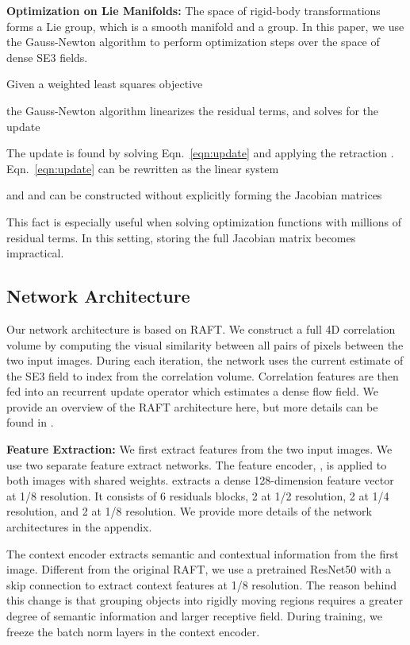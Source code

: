 \documentclass[final]{cvpr}
\begin{document}
\vspace{1mm} \noindent \textbf{Optimization on Lie Manifolds:} The space of rigid-body transformations forms a Lie group, which is a smooth manifold and a group. In this paper, we use the Gauss-Newton algorithm to perform optimization steps over the space of dense SE3 fields. 

Given a weighted least squares objective

the Gauss-Newton algorithm linearizes the residual terms, and solves for the update

The update is found by solving Eqn.~\ref{eqn:update} and applying the retraction . Eqn.~\ref{eqn:update} can be rewritten as the linear system

and  and  can be constructed without explicitly forming the Jacobian matrices

This fact is especially useful when solving optimization functions with millions of residual terms. In this setting, storing the full Jacobian matrix becomes impractical.

\subsection{Network Architecture}
Our network architecture is based on RAFT\cite{teed2020raft}. We construct a full 4D correlation volume by computing the visual similarity between all pairs of pixels between the two input images. During each iteration, the network uses the current estimate of the SE3 field to index from the correlation volume. Correlation features are then fed into an recurrent update operator which estimates a dense flow field. We provide an overview of the RAFT architecture here, but more details can be found in \cite{teed2020raft}.

\vspace{1mm} \noindent \textbf{Feature Extraction:}
We first extract features from the two input images. We use two separate feature extract networks. The feature encoder, , is applied to both images with shared weights.  extracts a dense 128-dimension feature vector at 1/8 resolution. It consists of 6 residuals blocks, 2 at 1/2 resolution, 2 at 1/4 resolution, and 2 at 1/8 resolution. We provide more details of the network architectures in the appendix.

The context encoder extracts semantic and contextual information from the first image. Different from the original RAFT\cite{teed2020raft}, we use a pretrained ResNet50\cite{resnet} with a skip connection to extract context features at 1/8 resolution. The reason behind this change is that grouping objects into rigidly moving regions requires a greater degree of semantic information and larger receptive field. During training, we freeze the batch norm layers in the context encoder.
\end{document}
